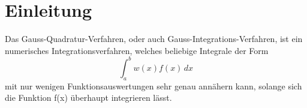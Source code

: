 %
%
%
\section{Einleitung\label{quadratur:section:einleitung}}

Das Gauss-Quadratur-Verfahren, oder auch Gauss-Integrations-Verfahren, ist ein numerisches Integrationsverfahren, welches beliebige Integrale der Form
\begin{equation}
\int_{a}^{b} w(x) f(x)\,dx
\end{equation}
mit nur wenigen Funktionsauswertungen sehr genau annähern kann, solange sich die Funktion f(x) überhaupt integrieren lässt.



